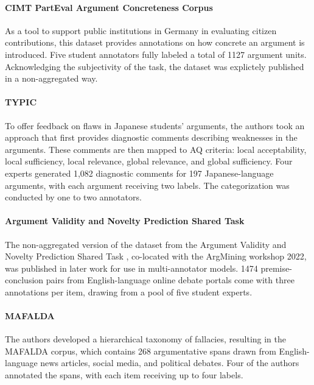 \paragraph{CIMT PartEval Argument Concreteness Corpus \cite{romberg-etal-2022-corpus}}
As a tool to support public institutions in Germany in evaluating citizen contributions, this dataset provides annotations on how concrete an argument is introduced. Five student annotators fully labeled a total of 1127 argument units. Acknowledging the subjectivity of the task, the dataset was explictely published in a non-aggregated way.

\paragraph{TYPIC \cite{naito-etal-2022-typic}}
To offer feedback on flaws in Japanese students' arguments, the authors took an approach that first provides diagnostic comments describing weaknesses in the arguments. These comments are then mapped to AQ criteria: local acceptability, local sufficiency, local relevance, global relevance, and global sufficiency. Four experts generated 1,082 diagnostic comments for 197 Japanese-language arguments, with each argument receiving two labels. The categorization was conducted by one to two annotators.

\paragraph{Argument Validity and Novelty Prediction Shared Task \cite{heinisch-etal-2023-architectural}}
The non-aggregated version of the dataset from the Argument Validity and Novelty Prediction Shared Task \cite{heinisch-etal-2022-overview}, co-located with the ArgMining workshop 2022, was published in later work for use in multi-annotator models. 1474 premise-conclusion pairs from English-language online debate portals come with three annotations per item, drawing from a pool of five student experts.

\paragraph{MAFALDA \cite{helwe-etal-2024-mafalda}}
The authors developed a hierarchical taxonomy of fallacies, resulting in the MAFALDA corpus, which contains 268 argumentative spans drawn from English-language news articles, social media, and political debates. Four of the authors annotated the spans, with each item receiving up to four labels.

